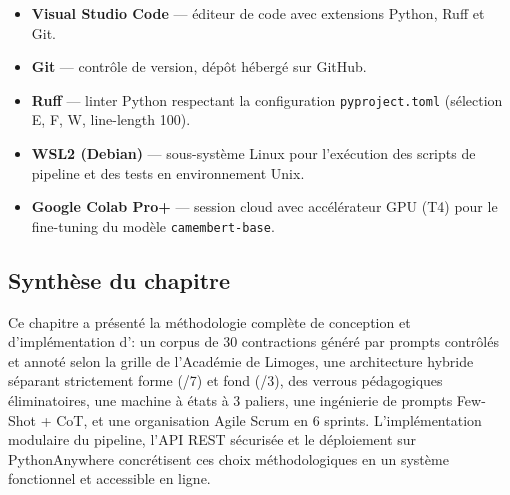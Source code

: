 \begin{itemize}
    \item \textbf{Visual Studio Code} — éditeur de code avec extensions Python, Ruff et Git.
    \item \textbf{Git} — contrôle de version, dépôt hébergé sur GitHub.
    \item \textbf{Ruff} — linter Python respectant la configuration \texttt{pyproject.toml} (sélection E, F, W, line-length 100).
    \item \textbf{WSL2 (Debian)} — sous-système Linux pour l'exécution des scripts de pipeline et des tests en environnement Unix.
    \item \textbf{Google Colab Pro+} — session cloud avec accélérateur GPU (T4) pour le fine-tuning du modèle \texttt{camembert-base}.
\end{itemize}

\subsection*{Synthèse du chapitre}

Ce chapitre a présenté la méthodologie complète de conception et d'implémentation d'\AZIZA : un corpus de 30 contractions généré par prompts contrôlés et annoté selon la grille de l'Académie de Limoges, une architecture hybride séparant strictement forme (/7) et fond (/3), des verrous pédagogiques éliminatoires, une machine à états à 3 paliers, une ingénierie de prompts Few-Shot + CoT, et une organisation Agile Scrum en 6 sprints. L'implémentation modulaire du pipeline, l'API REST sécurisée et le déploiement sur PythonAnywhere concrétisent ces choix méthodologiques en un système fonctionnel et accessible en ligne.
